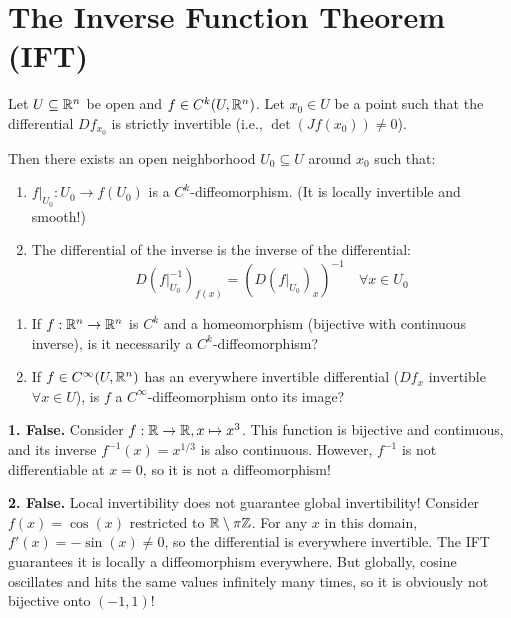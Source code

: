 \hrulefill

\section{The Inverse Function Theorem (IFT)}

\begin{theorem*}
Let $U \subseteq \mathbb{R}^n$ be open and $f \in C^k(U, \mathbb{R}^n)$. Let $x_0 \in U$ be a point such that the differential $Df_{x_0}$ is strictly invertible (i.e., $\det(Jf(x_0)) \ne 0$).

Then there exists an open neighborhood $U_0 \subseteq U$ around $x_0$ such that:
\begin{enumerate}
    \item $f|_{U_0}: U_0 \to f(U_0)$ is a $C^k$-diffeomorphism. \textcolor{eGray}{(It is locally invertible and smooth!)}
    \item The differential of the inverse is the inverse of the differential: 
    \[ D(f|_{U_0}^{-1})_{f(x)} = \left( D(f|_{U_0})_x \right)^{-1} \quad \forall x \in U_0 \]
\end{enumerate}
\end{theorem*}


\begin{question*}
\begin{enumerate}
    \item If $f: \mathbb{R}^n \to \mathbb{R}^n$ is $C^k$ and a homeomorphism (bijective with continuous inverse), is it necessarily a $C^k$-diffeomorphism?
    \item If $f \in C^\infty(U, \mathbb{R}^n)$ has an everywhere invertible differential ($Df_x$ invertible $\forall x \in U$), is $f$ a $C^\infty$-diffeomorphism onto its image?
\end{enumerate}
\end{question*}

\begin{answer*}
\textbf{1. False.} Consider $f: \mathbb{R} \to \mathbb{R}, x \mapsto x^3$. This function is bijective and continuous, and its inverse $f^{-1}(x) = x^{1/3}$ is also continuous. However, $f^{-1}$ is not differentiable at $x=0$, so it is not a diffeomorphism!

\textbf{2. False.} Local invertibility does not guarantee global invertibility! Consider $f(x) = \cos(x)$ restricted to $\mathbb{R} \setminus \pi\mathbb{Z}$. For any $x$ in this domain, $f'(x) = -\sin(x) \ne 0$, so the differential is everywhere invertible. The IFT guarantees it is locally a diffeomorphism everywhere. But globally, cosine oscillates and hits the same values infinitely many times, so it is obviously not bijective onto $(-1, 1)$!
\end{answer*}

